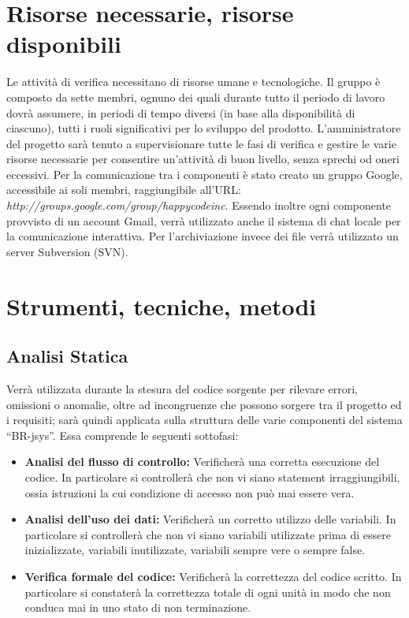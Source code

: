 \documentclass[11pt,titlepage,a4paper]{report}
\begin{document}
\section{Risorse necessarie, risorse disponibili}
Le attivit\`a di verifica necessitano di risorse umane e tecnologiche. Il gruppo \`e composto da sette membri, ognuno dei quali durante tutto il periodo di lavoro dovr\`a assumere, in periodi di tempo diversi (in base alla disponibilit\`a di ciascuno), tutti i ruoli significativi per lo sviluppo del prodotto. L'amministratore del progetto sar\`a tenuto a supervisionare tutte le fasi di verifica e gestire le varie risorse necessarie per consentire un'attivit\`a di buon livello, senza sprechi od oneri eccessivi. Per la comunicazione tra i componenti \`e stato creato un gruppo Google, accessibile ai soli membri, raggiungibile all'URL: \textit{http://groups.google.com/group/happycodeinc}. Essendo inoltre ogni componente provvisto di un account Gmail, verr\`a utilizzato anche il sistema di chat locale per la comunicazione interattiva. Per l'archiviazione invece dei file verr\`a utilizzato un server Subversion (SVN).

\section{Strumenti, tecniche, metodi}
\subsection{Analisi Statica}
Verr\`a utilizzata durante la stesura del codice sorgente per rilevare errori, omissioni o anomalie, oltre ad incongruenze che possono sorgere tra il progetto ed i requisiti; sar\`a quindi applicata sulla struttura delle varie componenti del sistema ``BR-jsys''. Essa comprende le seguenti sottofasi:
\begin{itemize}
\item \textbf{Analisi del flusso di controllo:} Verificher\`a una corretta esecuzione del codice.
In particolare si controller\`a che non vi siano statement irraggiungibili, ossia istruzioni la cui condizione di accesso non pu\`o mai essere vera.
\item \textbf{Analisi dell'uso dei dati:} Verificher\`a un corretto utilizzo delle variabili.
In particolare si controller\`a che non vi siano variabili utilizzate prima di essere inizializzate, variabili inutilizzate, variabili sempre vere o sempre false.
\item \textbf{Verifica formale del codice:} Verificher\`a la correttezza del codice scritto. In particolare si constater\`a la correttezza totale di ogni unit\`a in modo che non conduca mai in uno stato di non terminazione.
\end{itemize}
\end{document}
